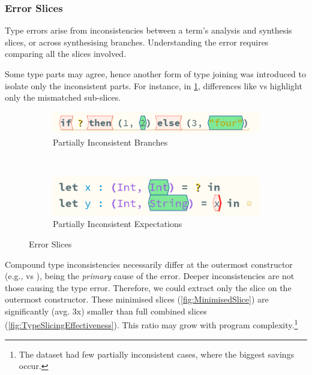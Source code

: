 \subsubsection{Error Slices}
\label{sec:ErrorSlices}
Type errors arise from inconsistencies between a term’s analysis and synthesis slices, or across synthesising branches. Understanding the error requires comparing all the slices involved.

Some type parts may agree, hence another form of type joining was introduced to isolate only the inconsistent parts. For instance, in \cref{fig:ErrorSlice}, differences like  vs  highlight only the mismatched sub-slices.

\begin{figure}[h]
\begin{subfigure}{0.45\textwidth}
\centering

\includegraphics[width=1\textwidth]{Media/Figures/partially_inconsistent_branches}
\caption{Partially Inconsistent Branches}
\end{subfigure}$\qquad$
\begin{subfigure}{0.45\textwidth}
\centering

\includegraphics[width=1\textwidth]{Media/Figures/partially_inconsistent_expectations}
\caption{Partially Inconsistent Expectations}
\end{subfigure}

\caption{Error Slices}
\label{fig:ErrorSlice}
\end{figure}

Compound type inconsistencies necessarily differ at the outermost constructor (e.g.,  vs ), being the \textit{primary} cause of the error. Deeper inconsistencies are not those causing the type error. Therefore, we could extract only the slice on the outermost constructor. These minimised slices (\cref{fig:MinimisedSlice}) are significantly (avg. 3x) smaller than full combined slices (\cref{fig:TypeSlicingEffectiveness}). This ratio may grow with program complexity.\footnote{The dataset had few partially inconsistent cases, where the biggest savings occur.}

